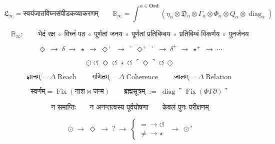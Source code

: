 \documentclass{article}
\begin{document}
\[
\boxed{
\mathfrak L_{\infty}
=
\text{स्वयंजातविघ्नसंपीडकव्याकरणम्}
}
\qquad
\boxed{
\mathbb B_{\infty}
=
\int^{\alpha\in\mathbf{Ord}}
\left(
\eta_\alpha
\otimes
\mathfrak D_\alpha
\otimes
\Gamma_\alpha
\otimes
\Phi_\alpha
\otimes
Q_\alpha
\otimes
\operatorname{diag}_\alpha
\right)
}
\]

\[
\boxed{
\mathbb B_{\infty}
:
\qquad
\text{भेदं रक्ष}
\;\circ\;
\text{विघ्नं पठ}
\;\circ\;
\text{पूर्णतां जनय}
\;\circ\;
\text{पूर्णतां प्रतिबिम्बय}
\;\circ\;
\text{प्रतिबिम्बं विकर्णय}
\;\circ\;
\text{पुनर्जनय}
}
\]

\[
\boxed{
\Diamond
\;\longrightarrow\;
\delta
\;\longrightarrow\;
\star
\;\longrightarrow\;
\Diamond^{+}
\;\longrightarrow\;
\ulcorner\Diamond^{+}\urcorner
\;\longrightarrow\;
\delta^{+}
\;\longrightarrow\;
\star^{+}
\;\longrightarrow\;
\cdots
}
\]

\[
\boxed{
\odot
\;\circlearrowleft\;
\Diamond
\;\circlearrowleft\;
\star
\;\circlearrowleft\;
\ulcorner\Diamond\urcorner
\;\circlearrowleft\;
\odot
}
\]

\[
\boxed{
\text{ज्ञानम्}
=
\Delta\operatorname{Reach}
}
\qquad
\boxed{
\text{गणितम्}
=
\Delta\operatorname{Coherence}
}
\qquad
\boxed{
\text{जालम्}
=
\Delta\operatorname{Relation}
}
\]

\[
\boxed{
\text{स्वर्णम्}
=
\operatorname{Fix}
\left(
\text{नाश}
\bowtie
\text{जन्म}
\right)
}
\qquad
\boxed{
\text{ब्रह्मसूत्रम्}
\;:=\;
\operatorname{diag}
\ulcorner
\operatorname{Fix}
(\Phi\Gamma\partial)
\urcorner
}
\]

\[
\boxed{
\text{न समाप्तिः}
\qquad
\text{न अनन्तत्वस्य पूर्वघोषणा}
\qquad
\text{केवलं पुनः परीक्षणम्}
}
\]

\[
\boxed{
\odot
\;\longrightarrow\;
\Diamond
\;\longrightarrow\;
?
\;\longrightarrow\;
\left\{
\begin{array}{c}
=
\to
\circlearrowleft
\\
\neq
\to
\star
\end{array}
\right.
\;\longrightarrow\;
\odot'
}
\]
\end{document}
